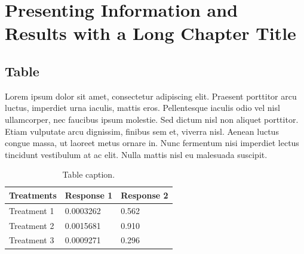 \documentclass[
	11pt,
	fleqn,
	a4paper,
]{LegrandOrangeBook}
\begin{document}

\chapterspaceabove{6.25cm} %
\chapterspacebelow{7.5cm} %


\chapter{Presenting Information and Results with a Long Chapter Title}

\section{Table}

Lorem ipsum dolor sit amet, consectetur adipiscing elit. Praesent porttitor arcu luctus, imperdiet urna iaculis, mattis eros. Pellentesque iaculis odio vel nisl ullamcorper, nec faucibus ipsum molestie. Sed dictum nisl non aliquet porttitor. Etiam vulputate arcu dignissim, finibus sem et, viverra nisl. Aenean luctus congue massa, ut laoreet metus ornare in. Nunc fermentum nisi imperdiet lectus tincidunt vestibulum at ac elit. Nulla mattis nisl eu malesuada suscipit.

\begin{table}[H] %
    \centering %
    \begin{tabular}{L{0.15\textwidth} R{0.15\textwidth} R{0.15\textwidth}} %
        \toprule
        \textbf{Treatments} & \textbf{Response 1} & \textbf{Response 2} \\
        \midrule
        Treatment 1         & 0.0003262           & 0.562               \\
        Treatment 2         & 0.0015681           & 0.910               \\
        Treatment 3         & 0.0009271           & 0.296               \\
        \bottomrule
    \end{tabular}
    \caption{Table caption.}
    \label{tab:example} %
\end{table}
\end{document}
